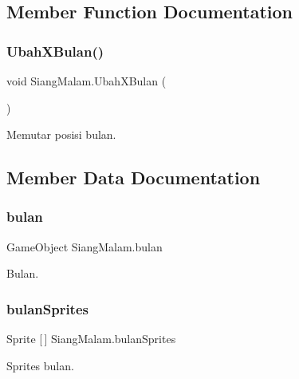 \subsection{Member Function Documentation}
\hypertarget{class_siang_malam_a1fccd6abbcae495a27af288d2aabf9a6}{}\label{class_siang_malam_a1fccd6abbcae495a27af288d2aabf9a6} 
\subsubsection{\texorpdfstring{Ubah\+X\+Bulan()}{UbahXBulan()}}
{\footnotesize\ttfamily void Siang\+Malam.\+Ubah\+X\+Bulan (\begin{DoxyParamCaption}{ }\end{DoxyParamCaption})}



Memutar posisi bulan. 



\subsection{Member Data Documentation}
\hypertarget{class_siang_malam_a1a1e6645cb6a9e4cfa6d753a5c10cfcf}{}\label{class_siang_malam_a1a1e6645cb6a9e4cfa6d753a5c10cfcf} 
\subsubsection{\texorpdfstring{bulan}{bulan}}
{\footnotesize\ttfamily Game\+Object Siang\+Malam.\+bulan}



Bulan. 

\hypertarget{class_siang_malam_a2d931b869867f22ed03b106d66868354}{}\label{class_siang_malam_a2d931b869867f22ed03b106d66868354} 
\subsubsection{\texorpdfstring{bulan\+Sprites}{bulanSprites}}
{\footnotesize\ttfamily Sprite \mbox{[}$\,$\mbox{]} Siang\+Malam.\+bulan\+Sprites}



Sprites bulan. 

